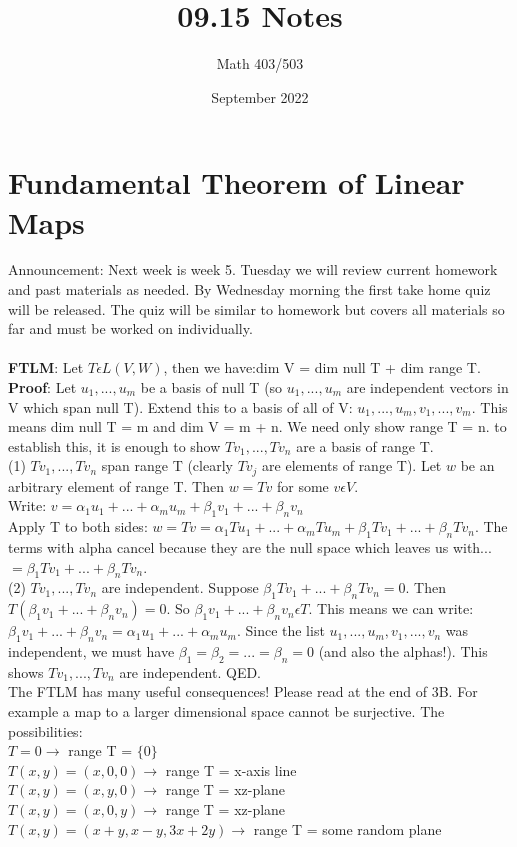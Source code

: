 \documentclass{article}
\title{09.15 Notes}
\author{Math 403/503 }
\date{September 2022}
\begin{document}
\maketitle

\section{Fundamental Theorem of Linear Maps}

Announcement: Next week is week 5. Tuesday we will review current homework and past materials as needed. By Wednesday morning the first take home quiz will be released. The quiz will be similar to homework but covers all materials so far and must be worked on individually. 
\\\\
\textbf{FTLM}: Let $T \epsilon L(V,W)$, then we have:dim V = dim null T + dim range T. \\
\textbf{Proof}: Let $u_1,..., u_m$ be a basis of null T (so $u_1,..., u_m$ are independent vectors in V which span null T). Extend this to a basis of all of V: $u_1,..., u_m, v_1, ..., v_m$. This means dim null T = m and dim V = m + n. We need only show range T = n. to establish this, it is enough to show $Tv_1, ..., Tv_n$ are a basis of range T. \\
(1) $Tv_1, ..., Tv_n$ span range T (clearly $Tv_j$ are elements of range T). Let $w$ be an arbitrary element of range T. Then $w = Tv$ for some $v \epsilon V$. \\
Write: $v = \alpha_1u_1 + ... + \alpha_mu_m + \beta _1 v_1 + ... + \beta_n v_n$\\
Apply T to both sides: $w = Tv = \alpha_1Tu_1 + ... + \alpha_mTu_m + \beta _1Tv_1 + ... + \beta_nTv_n$. The terms with alpha cancel because they are the null space which leaves us with... $=\beta _1Tv_1 + ... + \beta_nTv_n$.\\
(2) $Tv_1, ..., Tv_n$ are independent. Suppose $\beta _1Tv_1 + ... + \beta_nTv_n = 0$. Then $T(\beta_1v_1 + ... + \beta_nv_n) = 0$. So $\beta_1v_1 + ... + \beta_nv_n \epsilon T$. This means we can write: $\beta_1v_1 + ... + \beta_nv_n = \alpha_1 u_1 + ... + \alpha_m u_m$. Since the list $u_1, ..., u_m, v_1, ..., v_n$ was independent, we must have $\beta_1 = \beta_2 = ... = \beta_n = 0$ (and also the alphas!). This shows $Tv_1, ..., Tv_n$ are independent. QED. \\

The FTLM has many useful consequences! Please read at the end of 3B. For example a map to a larger dimensional space cannot be surjective. The possibilities: \\
$T = 0 \rightarrow$ range T = $\{ 0 \}$\\
$T(x,y) = (x, 0, 0) \rightarrow$ range T = x-axis line \\
$T(x,y) = (x, y, 0) \rightarrow $ range T = xz-plane \\
$T(x,y) = (x, 0, y) \rightarrow $ range T = xz-plane \\
$T(x,y) = (x+y, x-y, 3x+2y) \rightarrow$ range T = some random plane \\\\
\end{document}
